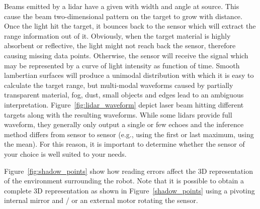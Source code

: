 Beams emitted by a \gls{lidar} have a given with width and angle at source. This cause the beam two-dimensional pattern on the target to grow with distance. Once the light hit the target, it bounces back to the sensor which will extract the range information out of it. Obviously, when the target material is highly absorbent or reflective, the light might not reach back the sensor, therefore causing missing data points. Otherwise, the sensor will receive the signal which may be represented by a curve of light intensity as function of time. Smooth lambertian surfaces will produce a unimodal distribution with which it is easy to calculate the target range, but multi-modal waveforms caused by partially transparent material, fog, dust, small objects and edges lead to an ambiguous interpretation. Figure~\ref{fig:lidar_waveform} depict laser beam hitting different targets along with the resulting waveforms. While some \gls{lidar}s provide full waveform, they generally only output a single or few echoes and the inference method differs from sensor to sensor (e.g., using the first or last maximum, using the mean). For this reason, it is important to determine whether the sensor of your choice is well suited to your needs. 

Figure~\ref{fig:shadow_points} show how reading errors affect the 3D representation of the environment surrounding the robot.  Note that it is possible to obtain a complete 3D representation as shown in Figure~\ref{shadow_points} using a pivoting internal mirror and / or an external motor rotating the sensor. 

